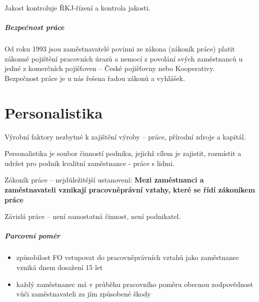 \documentclass[11pt,a4paper,twoside]{book}
\begin{document}
	Jakost kontroluje ŘKJ-řízení a kontrola jakosti.

	\paragraph*{Bezpečnost práce}
	Od roku 1993 jsou zaměstnavatelé povinni ze zákona (zákoník práce) platit zákonné pojištění pracovních úrazů a nemocí z povolání svých zaměstnanců u jedné z komerčních pojišťoven -- České pojišťovny nebo Kooperativy. \\ Bezpečnost práce je u nás řešena řadou zákonů a vyhlášek.

	\chapter{Personalistika}

	Výrobní faktory nezbytné k zajištění výroby -- práce, přírodní zdroje a kapitál.

	Personalistika je soubor činností podniku, jejichž cílem je zajistit, rozmístit a udržet pro podnik kvalitní zaměstnance - práce s lidmi.

	Zákoník práce -- nejdůležitější ustanovení: \textbf{Mezi zaměstnanci a zaměstnavateli vznikají pracovněprávní vztahy, které se řídí zákoníkem práce}

	Závislá práce -- není samostatná činnost, není podnikatel.

	\paragraph*{Parcovní poměr}
	\begin{itemize}
		\item způsobilost FO vstupovat do pracovněprávních vztahů jako zaměstnanec vzniká dnem dosažení 15 let
		\item každý zaměstnanec má v průběhu pracovního poměru obecnou zodpovědnost vůči zaměstnavateli za jím způsobené škody
	\end{itemize}
\end{document}
